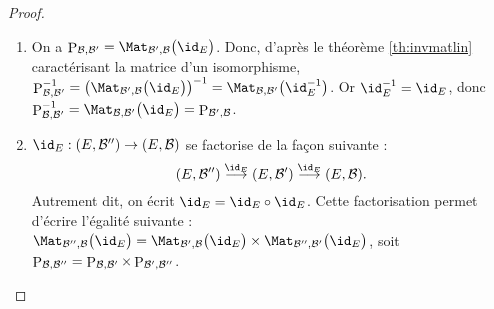 \documentclass[class=report,crop=false]{standalone}
\begin{document}
\begin{proof}
~
\begin{enumerate}
  \item On a $\Pass_{\mathcal{B},\mathcal{B}'}
  = \Mat_{\mathcal{B}',\mathcal{B}} \big(\id_E\big)$.
  Donc, d'après le théorème \ref{th:invmatlin} caractérisant la matrice d'un isomorphisme,
$\Pass_{\mathcal{B},\mathcal{B}'}^{-1}
= \left( \Mat_{\mathcal{B}',\mathcal{B}} \big(\id_E\big) \right)^{-1}
= \Mat_{\mathcal{B},\mathcal{B}'} \big(\id_E^{-1}\big)$.
Or $\id_E^{-1}=\id_E$, donc
$\Pass_{\mathcal{B},\mathcal{B}'}^{-1}
=\Mat_{\mathcal{B},\mathcal{B}'} \big( \id_E \big)
=\Pass_{\mathcal{B}',\mathcal{B}}$.

  \item $\id_E : (E,\mathcal{B}'')\to (E,\mathcal{B})$ se factorise de la façon suivante :
$$(E,\mathcal{B}'') \stackrel{\id_E}{\longrightarrow} (E,\mathcal{B}')
 \stackrel{\id_E}{\longrightarrow} (E,\mathcal{B}).$$
Autrement dit, on écrit $\id_E = \id_E \circ \id_E$.
Cette factorisation permet d'écrire l'égalité suivante :
$\Mat_{\mathcal{B}'',\mathcal{B}} \big( \id_E \big)
= \Mat_{\mathcal{B}',\mathcal{B}} \big( \id_E \big) \times
\Mat_{\mathcal{B}'',\mathcal{B}'} \big( \id_E \big)$,
soit $\mathop{\mathrm{P}}\nolimits_{\mathcal{B},\mathcal{B}''} =
\mathop{\mathrm{P}}\nolimits_{\mathcal{B},\mathcal{B}'}\times \mathop{\mathrm{P}}\nolimits_{\mathcal{B}',\mathcal{B}''}$.
\end{enumerate}
\end{proof}
\end{document}
